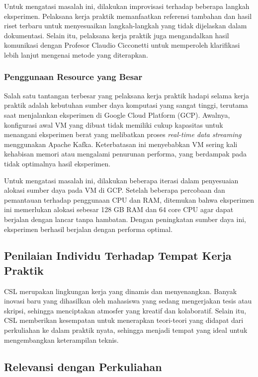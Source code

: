Untuk mengatasi masalah ini, dilakukan improvisasi terhadap beberapa langkah eksperimen. Pelaksana kerja praktik memanfaatkan referensi tambahan dan hasil riset terbaru untuk menyesuaikan langkah-langkah yang tidak dijelaskan dalam dokumentasi. Selain itu, pelaksana kerja praktik juga mengandalkan hasil komunikasi dengan Profesor Claudio Cicconetti untuk memperoleh klarifikasi lebih lanjut mengenai metode yang diterapkan.

\subsubsection{Penggunaan Resource yang Besar}

Salah satu tantangan terbesar yang pelaksana kerja praktik hadapi selama kerja praktik adalah kebutuhan sumber daya komputasi yang sangat tinggi, terutama saat menjalankan eksperimen di Google Cloud Platform (GCP). Awalnya, konfigurasi awal VM yang dibuat tidak memiliki cukup kapasitas untuk menangani eksperimen berat yang melibatkan proses \textit{real-time data streaming} menggunakan Apache Kafka. Keterbatasan ini menyebabkan VM sering kali kehabisan memori atau mengalami penurunan performa, yang berdampak pada tidak optimalnya hasil eksperimen.

Untuk mengatasi masalah ini, dilakukan beberapa iterasi dalam penyesuaian alokasi sumber daya pada VM di GCP. Setelah beberapa percobaan dan pemantauan terhadap penggunaan CPU dan RAM, ditemukan bahwa eksperimen ini memerlukan alokasi sebesar 128 GB RAM dan 64 core CPU agar dapat berjalan dengan lancar tanpa hambatan. Dengan peningkatan sumber daya ini, eksperimen berhasil berjalan dengan performa optimal.

\subsection{Penilaian Individu Terhadap Tempat Kerja Praktik}

CSL merupakan lingkungan kerja yang dinamis dan menyenangkan. Banyak inovasi baru yang dihasilkan oleh mahasiswa yang sedang mengerjakan tesis atau skripsi, sehingga menciptakan atmosfer yang kreatif dan kolaboratif. Selain itu, CSL memberikan kesempatan untuk menerapkan teori-teori yang didapat dari perkuliahan ke dalam praktik nyata, sehingga menjadi tempat yang ideal untuk mengembangkan keterampilan teknis.

\subsection{Relevansi dengan Perkuliahan}

